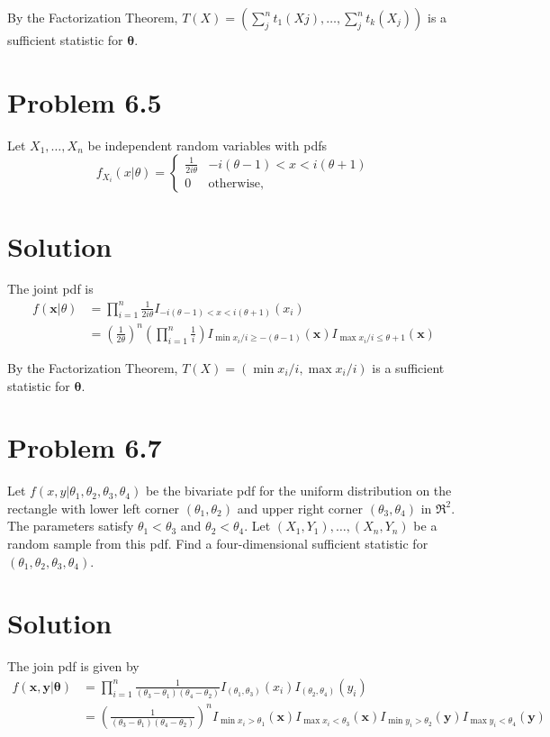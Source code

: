 \documentclass{article} %
\newcommand{\sample}[1]{#1_1 , \dots , #1_n}
\newcommand{\solution}[1]{\section*{Solution #1}}
\begin{document}
By the Factorization Theorem, $T(X) = (\sum \limits_j^n t_1(Xj), \dots, \sum \limits_j^n t_k(X_j))$ is a sufficient statistic for $\boldsymbol \theta$.


\section*{Problem 6.5}
Let $\sample{X}$ be independent random variables with pdfs
\begin{equation*}
  f_{X_i}(x|\theta) = \begin{cases}
  \frac{1}{2i\theta}  & -i(\theta - 1) < x  < i(\theta + 1) \\
  0 & \text{otherwise},
  \end{cases}
\end{equation*}

\solution{}
The joint pdf is
\begin{align*}
    f(\boldsymbol x | \theta) &= \prod \limits_{i=1}^n \frac{1}{2i\theta} I_{-i(\theta - 1) < x  < i(\theta + 1)}(x_i) \\
    &= (\frac{1}{2\theta})^n (\prod \limits_{i=1}^n \frac{1}{i}) I_{\min x_i/i \ge -(\theta - 1)}(\boldsymbol x)I_{\max x_i/i \le \theta + 1}(\boldsymbol x)
\end{align*}

By the Factorization Theorem, $T(X) = (\min x_i/i, \max x_i/i)$ is a sufficient statistic for $\boldsymbol \theta$.

\section*{Problem 6.7}
Let $f(x, y| \theta_1, \theta_2, \theta_3, \theta_4)$ be the bivariate pdf for the uniform distribution on the rectangle with lower left corner $(\theta_1, \theta_2)$ and upper right corner $(\theta_3, \theta_4)$ in $\Re^2$. The parameters satisfy $\theta_1 < \theta_3$ and $\theta_2 < \theta_4$. Let $(X_1 , Y_1 ), \dots ,(X_n , Y_n )$ be a random sample from this pdf. Find a four-dimensional sufficient statistic for $(\theta_1, \theta_2, \theta_3, \theta_4)$. \\

\solution{}
The join pdf is given by
\begin{align*}
    f(\boldsymbol x, \boldsymbol y | \boldsymbol \theta) &= \prod \limits_{i=1}^n \frac{1}{(\theta_3 - \theta_1)(\theta_4 - \theta_2)}I_{(\theta_1, \theta_3)}(x_i)I_{(\theta_2, \theta_4)}(y_i) \\
    &= (\frac{1}{(\theta_3 - \theta_1)(\theta_4 - \theta_2)})^n I_{\min x_i > \theta_1}(\boldsymbol x) I_{\max x_i < \theta_3}(\boldsymbol x)I_{\min y_i > \theta_2}(\boldsymbol y) I_{\max y_i < \theta_4}(\boldsymbol y)
\end{align*}
\end{document}
